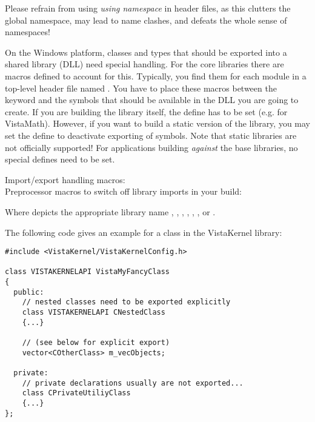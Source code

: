 Please refrain from using \emph{using namespace} in header files, as this clutters the global namespace, may lead to name clashes, and defeats the whole sense of namespaces!


On the Windows platform, classes and types that should be exported into a shared library (DLL) need special handling.
For the  core libraries there are macros defined to account for this. 
Typically, you find them for each module in a top-level header file named .
You have to place these macros between the  keyword and the symbols that should be available in the DLL you are going to create.
If you are building the library itself, the define  has to be set (e.g.  for VistaMath). 
However, if you want to build a static version of the library, you may set the define  to deactivate exporting of symbols. Note that static libraries are not officially supported!
For applications building \textit{against} the  base libraries, no special defines need to be set.

Import/export handling macros:  \\
Preprocessor macros to switch off library imports in your build: 

Where \code{[LIB]} depicts the appropriate library name , , , , , ,  or .

The following code gives an example for a class in the VistaKernel library:
\begin{verbatim}
#include <VistaKernel/VistaKernelConfig.h>

class VISTAKERNELAPI VistaMyFancyClass
{
  public:
    // nested classes need to be exported explicitly
    class VISTAKERNELAPI CNestedClass
    {...}

    // (see below for explicit export)
    vector<COtherClass> m_vecObjects;
	  
  private:
    // private declarations usually are not exported...
    class CPrivateUtiliyClass
    {...}
};
\end{verbatim}

